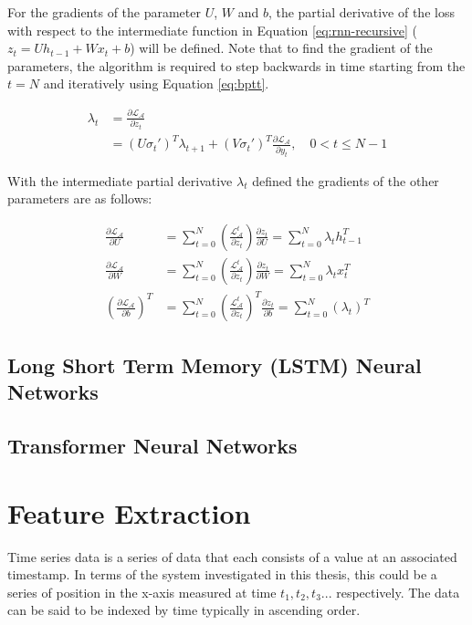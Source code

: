 For the gradients of the parameter $U$, $W$ and $b$, the partial derivative of the loss with respect to the intermediate function in Equation \ref{eq:rnn-recursive} ($z_t = Uh_{t-1} + Wx_t+b$) will be defined. Note that to find the gradient of the parameters, the algorithm is required to step backwards in time starting from the $t=N$ and iteratively using Equation \ref{eq:bptt}.

\begin{equation}
    \label{eq:bptt}
    \begin{split}
    \lambda_t &= \frac{\partial \mathcal{L}_\mathcal{A}}{\partial z_t}  \\
    &= (U\sigma_t')^T \lambda_{t+1} + (V \sigma_t')^T  \frac{\partial \mathcal{L}_\mathcal{A} }{\partial y_t}, \quad 0 < t \leq N - 1
    \end{split}
\end{equation}

With the intermediate partial derivative $\lambda_t$ defined the gradients of the other parameters are as follows:

\begin{equation}
    \begin{split}
        \frac{\partial \mathcal{L}_\mathcal{A}}{\partial U} &= \sum_{t=0}^{N}\left(\frac{\mathcal{L}_\mathcal{A}^t}{\partial z_t}\right) \frac{\partial z_t}{\partial U} = \sum_{t=0}^{N}\lambda_t h_{t-1}^T \\
        \frac{\partial \mathcal{L}_\mathcal{A}}{\partial W} &= \sum_{t=0}^{N}\left(\frac{\mathcal{L}_\mathcal{A}^t}{\partial z_t}\right) \frac{\partial z_t}{\partial W} = \sum_{t=0}^{N}\lambda_t x_{t}^T \\
        \left(\frac{\partial \mathcal{L}_\mathcal{A}}{\partial b}\right)^T &= \sum_{t=0}^{N}\left(\frac{\mathcal{L}_\mathcal{A}^t}{\partial z_t}\right)^T \frac{\partial z_t}{\partial b} = \sum_{t=0}^{N} (\lambda_t)^T
    \end{split}
\end{equation}

\subsection{Long Short Term Memory (LSTM) Neural Networks}
\subsection{Transformer Neural Networks}

\section{Feature Extraction}
Time series data is a series of data that each consists of a value at an associated timestamp. In terms of the system investigated in this thesis, this could be a series of position in the x-axis measured at time $t_1, t_2, t_3...$ respectively. The data can be said to be indexed by time \cite{yinPredictionAnalysisTime2023} typically in ascending order.

